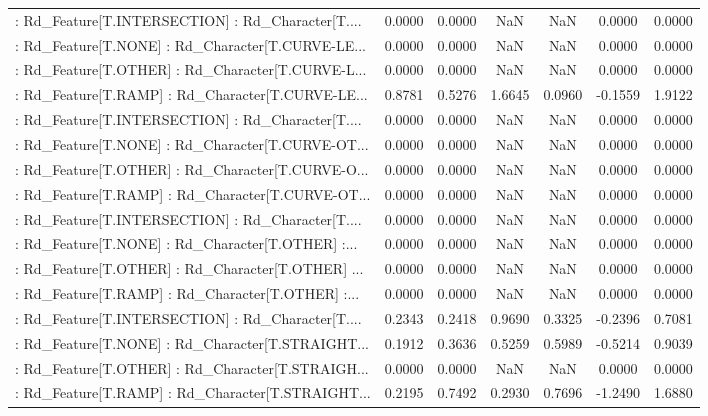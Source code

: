 \begin{longtable}{p{4cm}cccccc}
 : Rd\_Feature[T.INTERSECTION] : Rd\_Character[T.... &  0.0000 &    0.0000 &     NaN &          NaN &  0.0000 &  0.0000 \\
 : Rd\_Feature[T.NONE] : Rd\_Character[T.CURVE-LE... &  0.0000 &    0.0000 &     NaN &          NaN &  0.0000 &  0.0000 \\
 : Rd\_Feature[T.OTHER] : Rd\_Character[T.CURVE-L... &  0.0000 &    0.0000 &     NaN &          NaN &  0.0000 &  0.0000 \\
 : Rd\_Feature[T.RAMP] : Rd\_Character[T.CURVE-LE... &  0.8781 &    0.5276 &  1.6645 &       0.0960 & -0.1559 &  1.9122 \\
 : Rd\_Feature[T.INTERSECTION] : Rd\_Character[T.... &  0.0000 &    0.0000 &     NaN &          NaN &  0.0000 &  0.0000 \\
 : Rd\_Feature[T.NONE] : Rd\_Character[T.CURVE-OT... &  0.0000 &    0.0000 &     NaN &          NaN &  0.0000 &  0.0000 \\
 : Rd\_Feature[T.OTHER] : Rd\_Character[T.CURVE-O... &  0.0000 &    0.0000 &     NaN &          NaN &  0.0000 &  0.0000 \\
 : Rd\_Feature[T.RAMP] : Rd\_Character[T.CURVE-OT... &  0.0000 &    0.0000 &     NaN &          NaN &  0.0000 &  0.0000 \\
 : Rd\_Feature[T.INTERSECTION] : Rd\_Character[T.... &  0.0000 &    0.0000 &     NaN &          NaN &  0.0000 &  0.0000 \\
 : Rd\_Feature[T.NONE] : Rd\_Character[T.OTHER] :... &  0.0000 &    0.0000 &     NaN &          NaN &  0.0000 &  0.0000 \\
 : Rd\_Feature[T.OTHER] : Rd\_Character[T.OTHER] ... &  0.0000 &    0.0000 &     NaN &          NaN &  0.0000 &  0.0000 \\
 : Rd\_Feature[T.RAMP] : Rd\_Character[T.OTHER] :... &  0.0000 &    0.0000 &     NaN &          NaN &  0.0000 &  0.0000 \\
 : Rd\_Feature[T.INTERSECTION] : Rd\_Character[T.... &  0.2343 &    0.2418 &  0.9690 &       0.3325 & -0.2396 &  0.7081 \\
 : Rd\_Feature[T.NONE] : Rd\_Character[T.STRAIGHT... &  0.1912 &    0.3636 &  0.5259 &       0.5989 & -0.5214 &  0.9039 \\
 : Rd\_Feature[T.OTHER] : Rd\_Character[T.STRAIGH... &  0.0000 &    0.0000 &     NaN &          NaN &  0.0000 &  0.0000 \\
 : Rd\_Feature[T.RAMP] : Rd\_Character[T.STRAIGHT... &  0.2195 &    0.7492 &  0.2930 &       0.7696 & -1.2490 &  1.6880 \\

\end{longtable}
